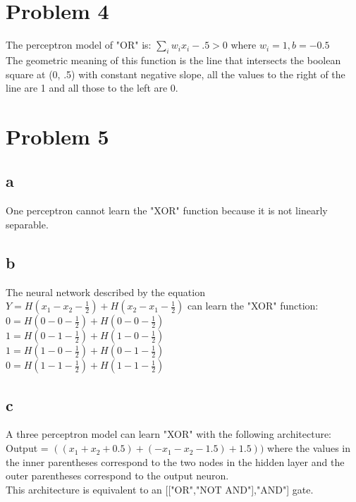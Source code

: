 \documentclass[a4paper,12pt]{article}
\begin{document}
\section{Problem 4}
The perceptron model of "OR" is: $\sum_iw_ix_i - .5 > 0$ where $w_i = 1, b = -0.5$\\
The geometric meaning of this function is the line that intersects the boolean square at (0, .5) with constant negative slope, all the values to the right of the line are 1 and all those to the left are 0.\\

\section{Problem 5}
\subsection{a}
One perceptron cannot learn the "XOR" function because it is not linearly separable.
\subsection{b}
The neural network described by the equation $Y = H(x_1-x_2-\frac{1}{2}) + H(x_2-x_1-\frac{1}{2})$ can learn the "XOR" function:\\
$0 = H(0-0-\frac{1}{2}) + H(0-0-\frac{1}{2})$\\
$1 = H(0-1-\frac{1}{2}) + H(1-0-\frac{1}{2})$\\
$1 = H(1-0-\frac{1}{2}) + H(0-1-\frac{1}{2})$\\
$0 = H(1-1-\frac{1}{2}) + H(1-1-\frac{1}{2})$\\
\subsection{c}
A three perceptron model can learn "XOR" with the following architecture:\\
Output = $((x_1+x_2+0.5) + (-x_1 - x_2 - 1.5) + 1.5))$ where the values in the inner parentheses correspond to the two nodes in the hidden layer and the outer parentheses correspond to the output neuron.\\
This architecture is equivalent to an [["OR","NOT AND"],"AND"] gate.
\end{document}
